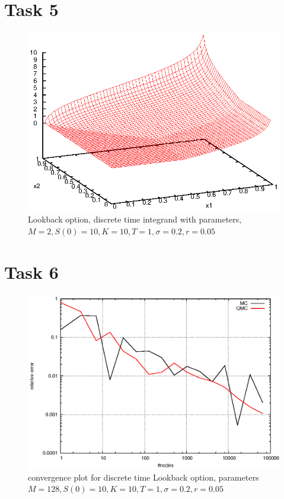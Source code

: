 \documentclass[]{article}
\begin{document}
\section*{Task 5}
\begin{figure}[!ht]
\centering
\includegraphics[width=.9\textwidth]{task5.eps}
\caption{Lookback option, discrete time integrand with parameters, $M=2,S(0)=10,K=10,T=1,\sigma=0.2,r=0.05$}
\label{fig:Task5}
\end{figure}
\clearpage

\section*{Task 6}
\begin{figure}[!ht]
\centering
\includegraphics[width=.9\textwidth]{task6.eps}
\caption{convergence plot for discrete time Lookback option, parameters $M=128,S(0)=10,K=10,T=1,\sigma=0.2,r=0.05$}
\label{fig:Task6}
\end{figure}
\clearpage
\end{document}
